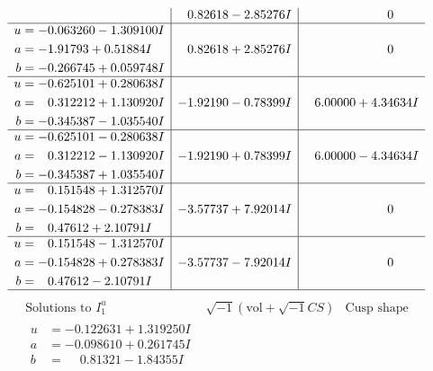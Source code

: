 \documentclass[1p]{elsarticle_modified}
\theoremstyle{definition}
\newcommand{\I}{\sqrt{-1}}
\begin{document}
$$\begin{array}{c|c|c}
 & \phantom{-}0.82618 - 2.85276 I & \phantom{-0.000000 } 0 \\ \hline\begin{aligned}
u &= -0.063260 - 1.309100 I \\
a &= -1.91793 + 0.51884 I \\
b &= -0.266745 + 0.059748 I\end{aligned}
 & \phantom{-}0.82618 + 2.85276 I & \phantom{-0.000000 } 0 \\ \hline\begin{aligned}
u &= -0.625101 + 0.280638 I \\
a &= \phantom{-}0.312212 + 1.130920 I \\
b &= -0.345387 - 1.035540 I\end{aligned}
 & -1.92190 - 0.78399 I & \phantom{-}6.00000 + 4.34634 I \\ \hline\begin{aligned}
u &= -0.625101 - 0.280638 I \\
a &= \phantom{-}0.312212 - 1.130920 I \\
b &= -0.345387 + 1.035540 I\end{aligned}
 & -1.92190 + 0.78399 I & \phantom{-}6.00000 - 4.34634 I \\ \hline\begin{aligned}
u &= \phantom{-}0.151548 + 1.312570 I \\
a &= -0.154828 - 0.278383 I \\
b &= \phantom{-}0.47612 + 2.10791 I\end{aligned}
 & -3.57737 + 7.92014 I & \phantom{-0.000000 } 0 \\ \hline\begin{aligned}
u &= \phantom{-}0.151548 - 1.312570 I \\
a &= -0.154828 + 0.278383 I \\
b &= \phantom{-}0.47612 - 2.10791 I\end{aligned}
 & -3.57737 - 7.92014 I & \phantom{-0.000000 } 0\\
 \hline 
 \end{array}$$\newpage$$\begin{array}{c|c|c}  
\text{Solutions to }I^u_{1}& \I (\text{vol} + \sqrt{-1}CS) & \text{Cusp shape}\\
 \hline 
\begin{aligned}
u &= -0.122631 + 1.319250 I \\
a &= -0.098610 + 0.261745 I \\
b &= \phantom{-}0.81321 - 1.84355 I\end{aligned}

\end{array}$$
\end{document}
